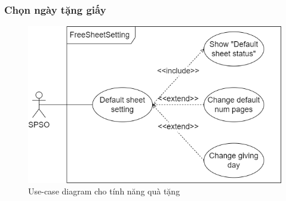 \subsubsection{Chọn ngày tặng giấy}
\begin{figure}[H]
    \begin{center}
        \includegraphics[width=1\textwidth]{Images/Requirement Elicitation/FreeSheetSetting_Use-case.png}
        \caption{Use-case diagram cho tính năng quà tặng}
        \label{fig:arch}
    \end{center}
\end{figure}
